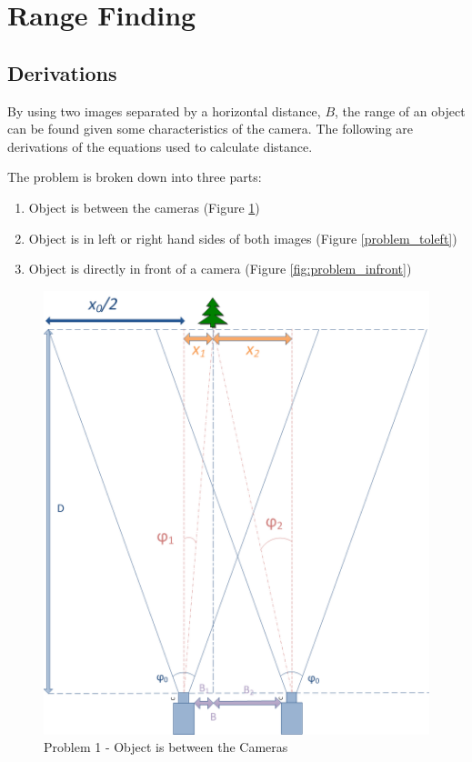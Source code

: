 \section{Range Finding}

\subsection{Derivations}

By using two images separated by a horizontal distance, $B$, the range of an object can be found given some characteristics of the camera. The following are derivations of the equations used to calculate distance. 

The problem is broken down into three parts:
\begin{enumerate}
\item Object is between the cameras (Figure \ref{problem_between})
\item Object is in left or right hand sides of both images (Figure \ref{problem_toleft})
\item Object is directly in front of a camera (Figure \ref{fig:problem_infront})
\end{enumerate}

\begin{figure}
\includegraphics[width=\textwidth,height=\textheight,keepaspectratio]{Figures/problem1.png}
\caption{Problem 1 - Object is between the Cameras}
\label{problem_between}
\end{figure}

